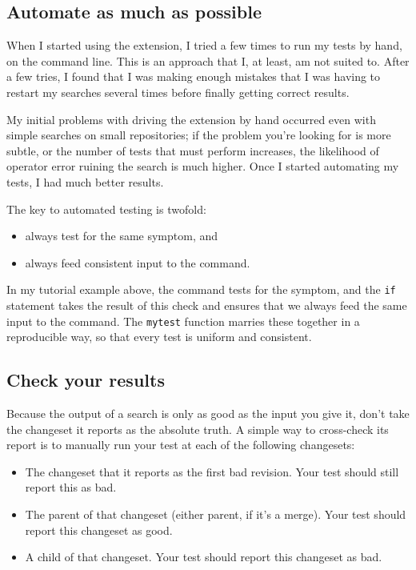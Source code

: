 \subsection{Automate as much as possible}

When I started using the  extension, I tried a few times
to run my tests by hand, on the command line.  This is an approach
that I, at least, am not suited to.  After a few tries, I found that I
was making enough mistakes that I was having to restart my searches
several times before finally getting correct results.  

My initial problems with driving the  extension by hand
occurred even with simple searches on small repositories; if the
problem you're looking for is more subtle, or the number of tests that
 must perform increases, the likelihood of operator
error ruining the search is much higher.  Once I started automating my
tests, I had much better results.

The key to automated testing is twofold:
\begin{itemize}
\item always test for the same symptom, and
\item always feed consistent input to the  command.
\end{itemize}
In my tutorial example above, the  command tests for the
symptom, and the \texttt{if} statement takes the result of this check
and ensures that we always feed the same input to the 
command.  The \texttt{mytest} function marries these together in a
reproducible way, so that every test is uniform and consistent.

\subsection{Check your results}

Because the output of a  search is only as good as the
input you give it, don't take the changeset it reports as the
absolute truth.  A simple way to cross-check its report is to manually
run your test at each of the following changesets:
\begin{itemize}
\item The changeset that it reports as the first bad revision.  Your
  test should still report this as bad.
\item The parent of that changeset (either parent, if it's a merge).
  Your test should report this changeset as good.
\item A child of that changeset.  Your test should report this
  changeset as bad.
\end{itemize}

